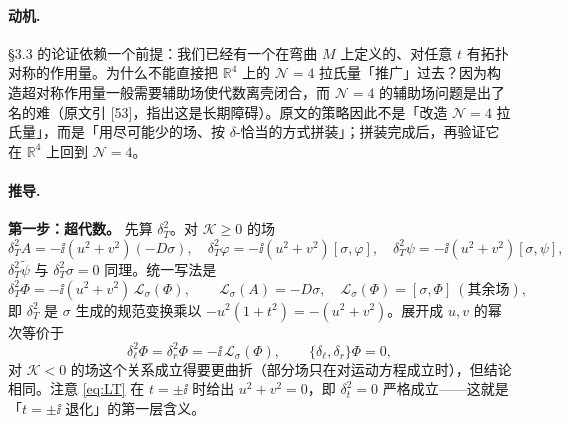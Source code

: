 \paragraph{动机.}
§3.3 的论证依赖一个前提：我们已经有一个在弯曲 $M$ 上定义的、对任意 $t$ 有拓扑对称的作用量。为什么不能直接把 $\mathbb R^4$ 上的 $\mathcal N=4$ 拉氏量「推广」过去？因为构造超对称作用量一般需要辅助场使代数离壳闭合，而 $\mathcal N=4$ 的辅助场问题是出了名的难（原文引 [53]，指出这是长期障碍）\pA{}。原文的策略因此不是「改造 $\mathcal N=4$ 拉氏量」，而是「用尽可能少的场、按 $\delta$-恰当的方式拼装」；拼装完成后，再验证它在 $\mathbb R^4$ 上回到 $\mathcal N=4$。

\paragraph{推导.}

\textbf{第一步：超代数。} 先算 $\delta_T^2$。对 $\mathcal K\ge0$ 的场\pA{}
\begin{equation}
\delta_T^2A=-\ii(u^2+v^2)(-D\sigma),\quad
\delta_T^2\varphi=-\ii(u^2+v^2)[\sigma,\varphi],\quad
\delta_T^2\psi=-\ii(u^2+v^2)[\sigma,\psi],
\label{eq:algebrasq}
\end{equation}
$\delta_T^2\tilde\psi$ 与 $\delta_T^2\sigma=0$ 同理。统一写法是
\begin{equation}
\delta_T^2\Phi=-\ii(u^2+v^2)\,\mathcal L_\sigma(\Phi),
\qquad
\mathcal L_\sigma(A)=-D\sigma,\quad \mathcal L_\sigma(\Phi)=[\sigma,\Phi]\ (\text{其余场}),
\label{eq:LT}
\end{equation}
即 $\delta_T^2$ 是 $\sigma$ 生成的规范变换乘以 $-u^2(1+t^2)=-(u^2+v^2)$。展开成 $u,v$ 的幂次等价于
\begin{equation}
\delta_\ell^2\Phi=\delta_r^2\Phi=-\ii\,\mathcal L_\sigma(\Phi),
\qquad
\{\delta_\ell,\delta_r\}\Phi=0 ,
\label{eq:lr}
\end{equation}
对 $\mathcal K<0$ 的场这个关系成立得要更曲折（部分场只在对运动方程成立时），但结论相同\pA{}。注意 \eqref{eq:LT} 在 $t=\pm\ii$ 时给出 $u^2+v^2=0$，即 $\delta_t^2=0$ 严格成立——这就是「$t=\pm\ii$ 退化」的第一层含义\pB。


